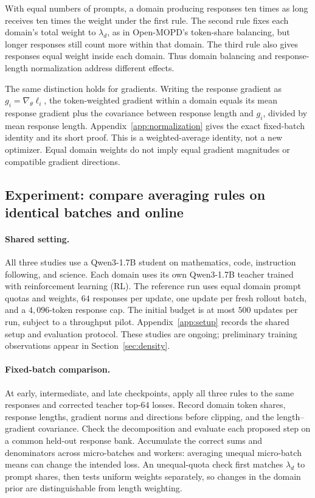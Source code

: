 With equal numbers of prompts, a domain producing responses ten times
as long receives ten times the weight under the first rule. The second
rule fixes each domain's total weight to $\lambda_d$, as in Open-MOPD's
token-share balancing, but longer responses still count more within
that domain. The third rule also gives responses equal weight inside
each domain. Thus domain balancing and response-length normalization
address different effects.

The same distinction holds for gradients. Writing the response gradient
as $g_i=\nabla_\theta\ell_i$, the token-weighted gradient within a domain
equals its mean response gradient plus the covariance between response
length and $g_i$, divided by mean response length.
Appendix~\ref{app:normalization} gives the exact fixed-batch identity
and its short proof. This is a weighted-average identity, not a new
optimizer. Equal domain weights do not imply equal gradient magnitudes
or compatible gradient directions.

\subsection{Experiment: compare averaging rules on identical batches and online}

\paragraph{Shared setting.}
All three studies use a Qwen3-1.7B student on mathematics, code,
instruction following, and science. Each domain uses its own
Qwen3-1.7B teacher trained with reinforcement learning (RL).
The reference run uses equal domain prompt quotas
and weights, $64$ responses per update, one update per fresh rollout
batch, and a $4{,}096$-token response cap. The initial budget is at most
$500$ updates per run, subject to a throughput pilot.
Appendix~\ref{app:setup} records the shared setup and evaluation protocol.
These studies are ongoing; preliminary training observations appear in
Section~\ref{sec:density}.

\paragraph{Fixed-batch comparison.}
At early, intermediate, and late checkpoints, apply all three rules to
the same responses and corrected teacher top-$64$ losses. Record domain
token shares, response lengths, gradient norms and directions before
clipping, and the length--gradient covariance. Check the decomposition
and evaluate each proposed step on a common held-out response bank.
Accumulate the correct sums and denominators across micro-batches and
workers: averaging unequal micro-batch means can change the intended
loss. An unequal-quota check first matches $\lambda_d$ to prompt shares,
then tests uniform weights separately, so changes in the domain prior
are distinguishable from length weighting.

